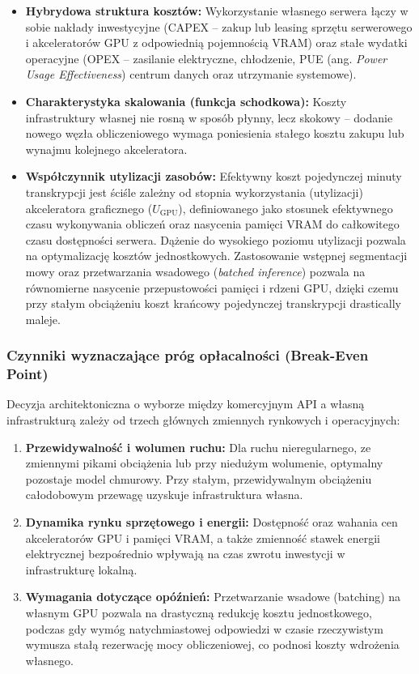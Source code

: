 \begin{itemize}
    \item \textbf{Hybrydowa struktura kosztów:} Wykorzystanie własnego serwera łączy w sobie nakłady inwestycyjne (CAPEX – zakup lub leasing sprzętu serwerowego i akceleratorów GPU z odpowiednią pojemnością VRAM) oraz stałe wydatki operacyjne (OPEX – zasilanie elektryczne, chłodzenie, PUE (ang. \textit{Power Usage Effectiveness}) centrum danych oraz utrzymanie systemowe).
    \item \textbf{Charakterystyka skalowania (funkcja schodkowa):} Koszty infrastruktury własnej nie rosną w sposób płynny, lecz skokowy – dodanie nowego węzła obliczeniowego wymaga poniesienia stałego kosztu zakupu lub wynajmu kolejnego akceleratora.
    \item \textbf{Współczynnik utylizacji zasobów:} Efektywny koszt pojedynczej minuty transkrypcji jest ściśle zależny od stopnia wykorzystania (utylizacji) akceleratora graficznego ($U_{\text{GPU}}$), definiowanego jako stosunek efektywnego czasu wykonywania obliczeń oraz nasycenia pamięci VRAM do całkowitego czasu dostępności serwera. Dążenie do wysokiego poziomu utylizacji pozwala na optymalizację kosztów jednostkowych. Zastosowanie wstępnej segmentacji mowy oraz przetwarzania wsadowego (\textit{batched inference}) pozwala na równomierne nasycenie przepustowości pamięci i rdzeni GPU, dzięki czemu przy stałym obciążeniu koszt krańcowy pojedynczej transkrypcji drastically maleje.
\end{itemize}

\subsubsection{Czynniki wyznaczające próg opłacalności (Break-Even Point)}

Decyzja architektoniczna o wyborze między komercyjnym API a własną infrastrukturą zależy od trzech głównych zmiennych rynkowych i operacyjnych:
\begin{enumerate}
    \item \textbf{Przewidywalność i wolumen ruchu:} Dla ruchu nieregularnego, ze zmiennymi pikami obciążenia lub przy niedużym wolumenie, optymalny pozostaje model chmurowy. Przy stałym, przewidywalnym obciążeniu całodobowym przewagę uzyskuje infrastruktura własna.
    \item \textbf{Dynamika rynku sprzętowego i energii:} Dostępność oraz wahania cen akceleratorów GPU i pamięci VRAM, a także zmienność stawek energii elektrycznej bezpośrednio wpływają na czas zwrotu inwestycji w infrastrukturę lokalną.
    \item \textbf{Wymagania dotyczące opóźnień:} Przetwarzanie wsadowe (batching) na własnym GPU pozwala na drastyczną redukcję kosztu jednostkowego, podczas gdy wymóg natychmiastowej odpowiedzi w czasie rzeczywistym wymusza stałą rezerwację mocy obliczeniowej, co podnosi koszty wdrożenia własnego.
\end{enumerate}

